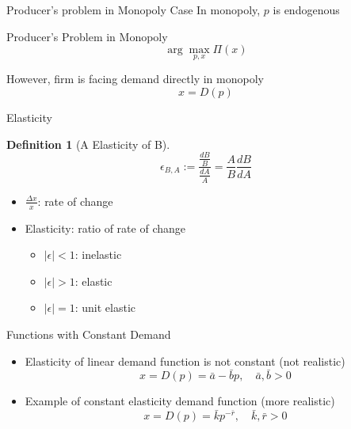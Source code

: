 \documentclass[a4paper,11pt]{article}
\newtheorem{defn}{Definition}
\begin{document}
\begin{frame}[t]{Producer's problem in Monopoly Case}
	In monopoly, $p$ is endogenous
	\begin{block}
		{Producer's Problem in Monopoly}
		\[
			\arg\max_{p,x} \Pi(x)
		\]
	\end{block}
	However, firm is facing demand directly in monopoly
	\[
		x=D(p) \tag{Demand Function}
	\]
\end{frame}

\begin{frame}[t]{Elasticity}
	\begin{defn}
		[A Elasticity of B]
		\[
			\epsilon_{B,A} := \frac{\frac{d B}{B}}{\frac{d A}{A}} = \frac{A}{B}\frac{dB}{dA}
		\]
	\end{defn}
	\begin{itemize}
		\item $\frac{\Delta x}{x}$: rate of change
		\item Elasticity: ratio of rate of change
		\begin{itemize}
			\item $|\epsilon|<1$: inelastic
			\item $|\epsilon|>1$: elastic
			\item $|\epsilon|=1$: unit elastic
		\end{itemize}
	\end{itemize}
\end{frame}

\begin{frame}[t]{Functions with Constant Demand}
	\begin{itemize}
		\item Elasticity of linear demand function is not constant (not realistic)
		\[
			x=D(p)=\bar a - \bar b p,\quad \bar a,\bar b >0
		\]
		\item Example of constant elasticity demand function (more realistic)
		\[
			x=D(p)=\bar k p^{-\bar r},\quad \bar k, \bar r >0
		\]
	\end{itemize}
\end{frame}

\end{document}
